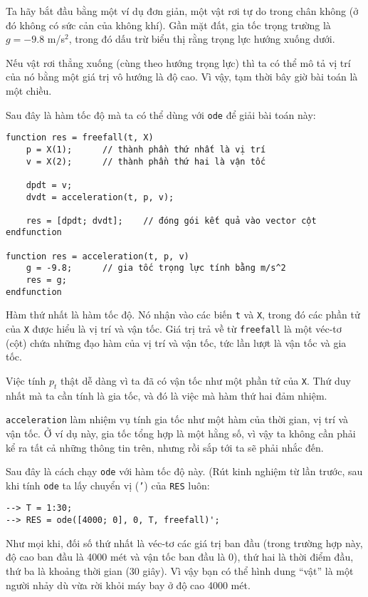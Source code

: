 \documentclass[12pt]{book}
\begin{document}
Ta hãy bắt đầu bằng một ví dụ đơn giản, một vật rơi tự do trong
chân không (ở đó không có sức cản của không khí). Gần mặt đất,
gia tốc trọng trường là $g = -9.8$ m/s$^2$, trong đó dấu trừ
biểu thị rằng trọng lực hướng xuống dưới.

Nếu vật rơi thẳng xuống (cùng theo hướng trọng lực) thì ta
có thể mô tả vị trí của nó bằng một giá trị vô hướng là độ cao.
Vì vậy, tạm thời bây giờ bài toán là một chiều.

Sau đây là hàm tốc độ mà ta có thể dùng với {\tt ode} để giải
bài toán này:

\begin{verbatim}
function res = freefall(t, X)
    p = X(1);      // thành phần thứ nhất là vị trí
    v = X(2);      // thành phần thứ hai là vận tốc

    dpdt = v;                          
    dvdt = acceleration(t, p, v);

    res = [dpdt; dvdt];    // đóng gói kết quả vào vector cột
endfunction

function res = acceleration(t, p, v)
    g = -9.8;      // gia tốc trọng lực tính bằng m/s^2
    res = g;
endfunction
\end{verbatim}
%
Hàm thứ nhất là hàm tốc độ. Nó nhận vào các biến {\tt t} và
{\tt X}, trong đó các phần tử của {\tt X} được hiểu là vị trí
và vận tốc. Giá trị trả về từ {\tt freefall} là một véc-tơ (cột)
chứa những đạo hàm của vị trí và vận tốc, tức lần lượt là
vận tốc và gia tốc.

Việc tính $p_t$ thật dễ dàng vì ta đã có vận tốc như một
phần tử của {\tt X}. Thứ duy nhất mà ta cần tính là gia tốc,
và đó là việc mà hàm thứ hai đảm nhiệm.

{\tt acceleration} làm nhiệm vụ tính gia tốc như một hàm của
thời gian, vị trí và vận tốc. Ở ví dụ này, gia tốc tổng hợp là một
hằng số, vì vậy ta không cần phải kể ra tất cả những thông tin
trên, nhưng rồi sắp tới ta sẽ phải nhắc đến.

Sau đây là cách chạy {\tt ode} với hàm tốc độ này. (Rút kinh
nghiệm từ lần trước, sau khi tính \texttt{ode} ta lấy chuyển vị
(\texttt{'}) của \texttt{RES} luôn:

\begin{verbatim}
--> T = 1:30;
--> RES = ode([4000; 0], 0, T, freefall)';
\end{verbatim}
%
Như mọi khi, đối số thứ nhất là véc-tơ các giá trị ban đầu
(trong trường hợp này, độ cao ban đầu là 4000 mét và 
vận tốc ban đầu là 0), thứ hai là thời điểm đầu, thứ ba là 
khoảng thời gian (30 giây).
Vì vậy bạn có thể hình dung ``vật'' là một người nhảy dù vừa
rời khỏi máy bay ở độ cao 4000 mét.
\end{document}
